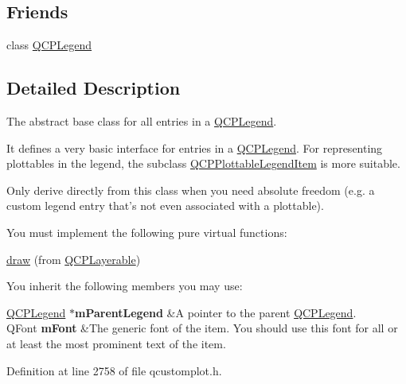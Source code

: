\subsection*{Friends}
\begin{DoxyCompactItemize}
\item 
class \hyperlink{class_q_c_p_abstract_legend_item_a8429035e7adfbd7f05805a6530ad5e3b}{Q\-C\-P\-Legend}
\end{DoxyCompactItemize}


\subsection{Detailed Description}
The abstract base class for all entries in a \hyperlink{class_q_c_p_legend}{Q\-C\-P\-Legend}. 

It defines a very basic interface for entries in a \hyperlink{class_q_c_p_legend}{Q\-C\-P\-Legend}. For representing plottables in the legend, the subclass \hyperlink{class_q_c_p_plottable_legend_item}{Q\-C\-P\-Plottable\-Legend\-Item} is more suitable.

Only derive directly from this class when you need absolute freedom (e.\-g. a custom legend entry that's not even associated with a plottable).

You must implement the following pure virtual functions\-: \begin{DoxyItemize}
\item \hyperlink{class_q_c_p_abstract_legend_item_a97dedc084c672359710f16b31d046d1d}{draw} (from \hyperlink{class_q_c_p_layerable}{Q\-C\-P\-Layerable})\end{DoxyItemize}
You inherit the following members you may use\-: \begin{TabularC}{2}
\hline
\hyperlink{class_q_c_p_legend}{Q\-C\-P\-Legend} $\ast${\bfseries m\-Parent\-Legend}  &A pointer to the parent \hyperlink{class_q_c_p_legend}{Q\-C\-P\-Legend}. \\
Q\-Font {\bfseries m\-Font}  &The generic font of the item. You should use this font for all or at least the most prominent text of the item.  \\
\end{TabularC}


Definition at line 2758 of file qcustomplot.\-h.



